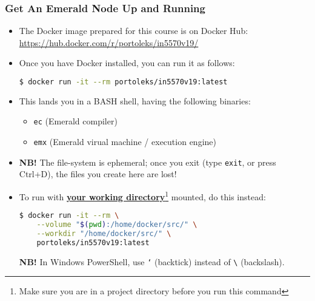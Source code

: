 \begin{frame}[fragile]

\frametitle{Get An Emerald Node Up and Running}

\begin{itemize}

\footnotesize

\item The Docker image prepared for this course is on Docker
Hub:\\[0.5em] \url{https://hub.docker.com/r/portoleks/in5570v19/}

\item Once you have Docker installed, you can run it as follows:

\begin{lstlisting}[language=bash]
$ docker run -it --rm portoleks/in5570v19:latest
\end{lstlisting}

\item This lands you in a BASH shell, having the following binaries:

\begin{itemize}

\footnotesize

\item \texttt{ec} (Emerald compiler)

\item \texttt{emx} (Emerald virual machine / execution engine)

\end{itemize}

\item \textbf{NB!} The file-system is ephemeral; once you exit (type
\texttt{exit}, or press Ctrl+D), the files you create here are lost!

\item To run with \textbf{\underline{your working
directory}}\footnote{Make sure you are in a project directory before
you run this command} mounted, do this instead:

\begin{lstlisting}[language=bash]
$ docker run -it --rm \
    --volume "$(pwd):/home/docker/src/" \
    --workdir "/home/docker/src/" \
    portoleks/in5570v19:latest
\end{lstlisting}

\textbf{NB!} In Windows PowerShell, use \texttt{\lq} (backtick)
instead of \texttt{\textbackslash} (backslash).

\end{itemize}

\end{frame}


